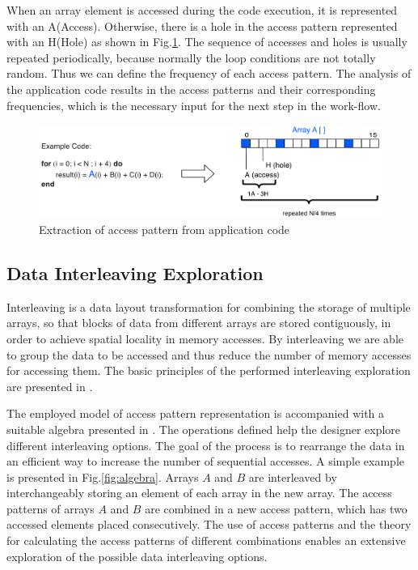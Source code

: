 When an array element is accessed during the code execution, it is represented with an A(Access).
Otherwise, there is a hole in the access pattern represented with an H(Hole) as shown in Fig.\ref{fig:pattern}.
The sequence of accesses and holes is usually repeated periodically, because normally the loop conditions are not totally random.
Thus we can define the frequency of each access pattern.
The analysis of the application code results in the access patterns and their corresponding frequencies, which is the necessary input for the next step in the work-flow.

\begin{figure}
\centering
	\includegraphics[scale = 0.6]{D/Images/AHpattern.pdf} 
	\caption{Extraction of access pattern from application code}
	\label{fig:pattern}
\end{figure}


\subsection{Data Interleaving Exploration}
Interleaving is a data layout transformation for combining the storage of multiple arrays, so that blocks of data from different arrays are stored contiguously, in order to achieve spatial locality in memory accesses.
By interleaving we are able to group the data to be accessed and thus reduce the number of memory accesses for accessing them.
The basic principles of the performed interleaving exploration are presented in \cite{sharma2013data}.

The employed model of access pattern representation is accompanied with a suitable algebra presented in \cite{kritikakou2013phd}.
The operations defined help the designer explore different interleaving options.
The goal of the process is to rearrange the data in an efficient way to increase the number of sequential accesses.
A simple example is presented in Fig.\ref{fig:algebra}.
Arrays $A$ and $B$ are interleaved by interchangeably storing an element of each array in the new array. 
The access patterns of arrays $A$ and $B$ are combined in a new access pattern, which has two accessed elements placed consecutively.
The use of access patterns and the theory for calculating the access patterns of different combinations enables an extensive exploration of the possible data interleaving options.

